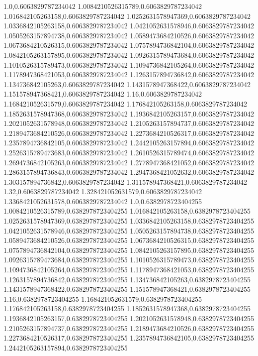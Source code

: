 1.0,0.6063829787234042
1.0084210526315789,0.6063829787234042
1.016842105263158,0.6063829787234042
1.0252631578947369,0.6063829787234042
1.0336842105263158,0.6063829787234042
1.0421052631578946,0.6063829787234042
1.0505263157894738,0.6063829787234042
1.0589473684210526,0.6063829787234042
1.0673684210526315,0.6063829787234042
1.0757894736842104,0.6063829787234042
1.0842105263157895,0.6063829787234042
1.0926315789473684,0.6063829787234042
1.1010526315789473,0.6063829787234042
1.1094736842105264,0.6063829787234042
1.1178947368421053,0.6063829787234042
1.1263157894736842,0.6063829787234042
1.134736842105263,0.6063829787234042
1.1431578947368422,0.6063829787234042
1.151578947368421,0.6063829787234042
1.16,0.6063829787234042
1.168421052631579,0.6063829787234042
1.176842105263158,0.6063829787234042
1.1852631578947368,0.6063829787234042
1.1936842105263157,0.6063829787234042
1.2021052631578948,0.6063829787234042
1.2105263157894737,0.6063829787234042
1.2189473684210526,0.6063829787234042
1.2273684210526317,0.6063829787234042
1.2357894736842105,0.6063829787234042
1.2442105263157894,0.6063829787234042
1.2526315789473683,0.6063829787234042
1.2610526315789474,0.6063829787234042
1.2694736842105263,0.6063829787234042
1.2778947368421052,0.6063829787234042
1.2863157894736843,0.6063829787234042
1.2947368421052632,0.6063829787234042
1.303157894736842,0.6063829787234042
1.311578947368421,0.6063829787234042
1.32,0.6063829787234042
1.328421052631579,0.6063829787234042
1.3368421052631578,0.6063829787234042
1.0,0.6382978723404255
1.0084210526315789,0.6382978723404255
1.016842105263158,0.6382978723404255
1.0252631578947369,0.6382978723404255
1.0336842105263158,0.6382978723404255
1.0421052631578946,0.6382978723404255
1.0505263157894738,0.6382978723404255
1.0589473684210526,0.6382978723404255
1.0673684210526315,0.6382978723404255
1.0757894736842104,0.6382978723404255
1.0842105263157895,0.6382978723404255
1.0926315789473684,0.6382978723404255
1.1010526315789473,0.6382978723404255
1.1094736842105264,0.6382978723404255
1.1178947368421053,0.6382978723404255
1.1263157894736842,0.6382978723404255
1.134736842105263,0.6382978723404255
1.1431578947368422,0.6382978723404255
1.151578947368421,0.6382978723404255
1.16,0.6382978723404255
1.168421052631579,0.6382978723404255
1.176842105263158,0.6382978723404255
1.1852631578947368,0.6382978723404255
1.1936842105263157,0.6382978723404255
1.2021052631578948,0.6382978723404255
1.2105263157894737,0.6382978723404255
1.2189473684210526,0.6382978723404255
1.2273684210526317,0.6382978723404255
1.2357894736842105,0.6382978723404255
1.2442105263157894,0.6382978723404255
